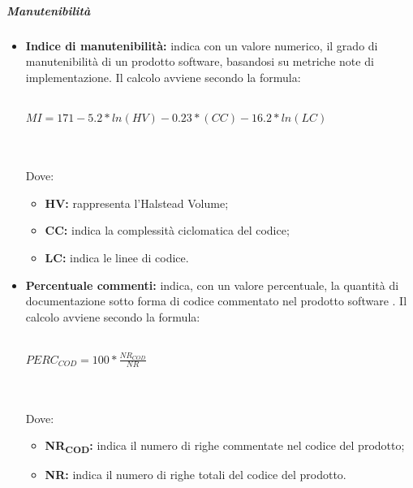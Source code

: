 \subparagraph*{Manutenibilità}
\begin{itemize}
	\item \textbf{Indice di manutenibilità:} indica con un valore numerico, il grado di manutenibilità di un prodotto software, basandosi su metriche note di implementazione. Il calcolo avviene secondo la formula:\\\\
	\centerline{
		\begin{math}
		MI= 171-5.2*ln(HV)-0.23*(CC)-16.2*ln(LC)
		\end{math}
	}
	\\\\Dove:
	\begin{itemize}
		\item \textbf{HV:} rappresenta l'Halstead Volume;
		\item \textbf{CC:} indica la complessità ciclomatica del codice;
		\item \textbf{LC:} indica le linee di codice.
	\end{itemize}
	\item \textbf{Percentuale commenti:} indica, con un valore percentuale, la quantità di documentazione sotto forma di codice commentato nel prodotto software . Il calcolo avviene secondo la formula:\\\\
	\centerline{
		\begin{math}
		PERC_{COD}=100*\frac{NR_{COD}}{NR}
		\end{math}
	}
	\\\\Dove:
	\begin{itemize}
		\item \textbf{NR\textsubscript{COD}:} indica il numero di righe commentate nel codice del prodotto;
		\item \textbf{NR:} indica il numero di righe totali del codice del prodotto.
	\end{itemize}
\end{itemize}
